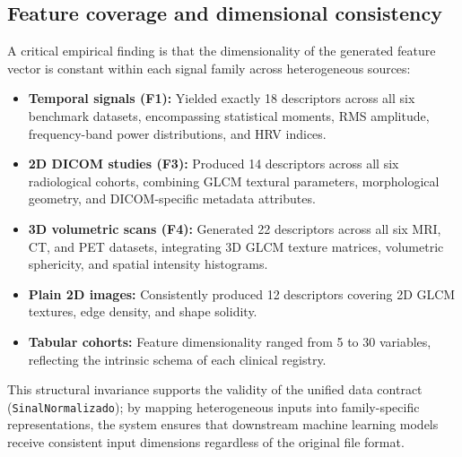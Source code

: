 \subsection{Feature coverage and dimensional consistency}
A critical empirical finding is that the dimensionality of the generated feature vector is constant within each signal family across heterogeneous sources:
\begin{itemize}
    \item \textbf{Temporal signals (F1):} Yielded exactly 18 descriptors across all six benchmark datasets, encompassing statistical moments, RMS amplitude, frequency-band power distributions, and HRV indices.
    \item \textbf{2D DICOM studies (F3):} Produced 14 descriptors across all six radiological cohorts, combining GLCM textural parameters, morphological geometry, and DICOM-specific metadata attributes.
    \item \textbf{3D volumetric scans (F4):} Generated 22 descriptors across all six MRI, CT, and PET datasets, integrating 3D GLCM texture matrices, volumetric sphericity, and spatial intensity histograms.
    \item \textbf{Plain 2D images:} Consistently produced 12 descriptors covering 2D GLCM textures, edge density, and shape solidity.
    \item \textbf{Tabular cohorts:} Feature dimensionality ranged from 5 to 30 variables, reflecting the intrinsic schema of each clinical registry.
\end{itemize}

This structural invariance supports the validity of the unified data contract (\texttt{SinalNormalizado}); by mapping heterogeneous inputs into family-specific representations, the system ensures that downstream machine learning models receive consistent input dimensions regardless of the original file format.
